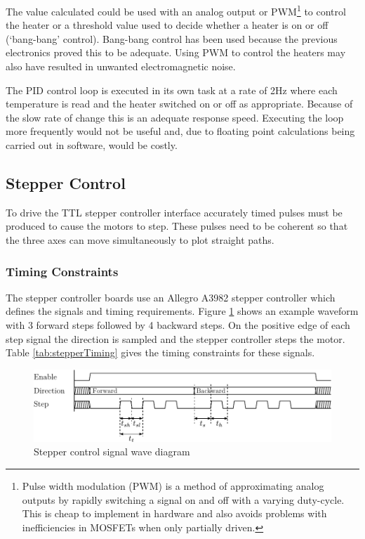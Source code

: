				The value calculated could be used with an analog output or
				PWM\footnote{Pulse width modulation (PWM) is a method of approximating
				analog outputs by rapidly switching a signal on and off with a varying
				duty-cycle. This is cheap to implement in hardware and also avoids
				problems with inefficiencies in MOSFETs when only partially driven.} to
				control the heater or a threshold value used to decide whether a heater
				is on or off (`bang-bang' control). Bang-bang control has been used
				because the previous electronics proved this to be adequate. Using PWM
				to control the heaters may also have resulted in unwanted
				electromagnetic noise.
				
				The PID control loop is executed in its own task at a rate of 2Hz where
				each temperature is read and the heater switched on or off as
				appropriate. Because of the slow rate of change this is an adequate
				response speed. Executing the loop more frequently would not be useful
				and, due to floating point calculations being carried out in software,
				would be costly.
		
		\subsection{Stepper Control}
			
			To drive the TTL stepper controller interface accurately timed pulses must
			be produced to cause the motors to step. These pulses need to be coherent
			so that the three axes can move simultaneously to plot straight paths.
			
			\subsubsection{Timing Constraints}
				
				The stepper controller boards use an Allegro A3982 stepper controller
				which defines the signals and timing requirements. Figure
				\ref{fig:stepperWave} shows an example waveform with 3 forward steps
				followed by 4 backward steps. On the positive edge of each step signal
				the direction is sampled and the stepper controller steps the motor.
				Table \ref{tab:stepperTiming} gives the timing constraints for these
				signals.
				
				\begin{figure}
					\includegraphics[width=1\textwidth]{diagrams/stepperWave.pdf}
					\caption{Stepper control signal wave diagram}
					\label{fig:stepperWave}
				\end{figure}
				
